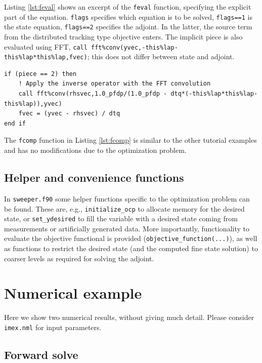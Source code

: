 \documentclass[a4paper]{article} %
\begin{document}
Listing \ref{lst:feval} shows an excerpt of the \lstinline|feval| function, specifying the explicit part of the equation. \lstinline|flags| specifies which equation is to be solved, \lstinline|flags==1| is the state equation, \lstinline|flags==2| specifies the adjoint. In the latter, the source term from the distributed tracking type objective enters. The implicit piece is also evaluated using FFT, \lstinline|call fft%conv(yvec,-this%lap-this%lap*this%lap,fvec)|; this does not differ between state and adjoint.

\begin{lstlisting}[frame=tb,caption={Excerpt of \lstinline|fcomp| from \lstinline|sweeper.f90|},label=lst:fcomp]
if (piece == 2) then
	! Apply the inverse operator with the FFT convolution
	call fft%conv(rhsvec,1.0_pfdp/(1.0_pfdp - dtq*(-this%lap*this%lap-this%lap)),yvec)
	fvec = (yvec - rhsvec) / dtq
end if
\end{lstlisting}

The \lstinline|fcomp| function in Listing \ref{lst:fcomp} is similar to the other tutorial examples and has no modifications due to the optimization problem.


\subsection{Helper and convenience functions}

In \lstinline|sweeper.f90| some helper functions specific to the optimization problem can be found. These are, e.g., \lstinline|initialize_ocp| to allocate memory for the desired state, or \lstinline|set_ydesired| to fill the variable with a desired state coming from measurements or artificially generated data. More importantly, functionality to evaluate the objective functional is provided (\lstinline|objective_function(...)|), as well as functions to restrict the desired state (and the computed fine state solution) to coarser levels as required for solving the adjoint.

\section{Numerical example}

Here we show two numerical results, without giving much detail. Please consider \lstinline|imex.nml| for input parameters.

\subsection{Forward solve}
\end{document}
